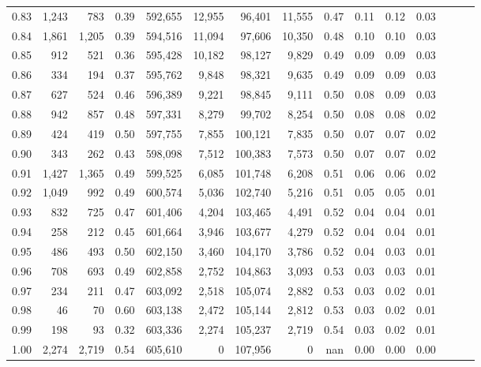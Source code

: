 \begin{tabular}{rrrrrrrrrrrrrrr}
0.83 &   1,243 &    783 &  0.39 &  592,655 &   12,955 &   96,401 &   11,555 &  0.47 &  0.11 &  0.12 &      0.03 \\
0.84 &   1,861 &  1,205 &  0.39 &  594,516 &   11,094 &   97,606 &   10,350 &  0.48 &  0.10 &  0.10 &      0.03 \\
0.85 &     912 &    521 &  0.36 &  595,428 &   10,182 &   98,127 &    9,829 &  0.49 &  0.09 &  0.09 &      0.03 \\
0.86 &     334 &    194 &  0.37 &  595,762 &    9,848 &   98,321 &    9,635 &  0.49 &  0.09 &  0.09 &      0.03 \\
0.87 &     627 &    524 &  0.46 &  596,389 &    9,221 &   98,845 &    9,111 &  0.50 &  0.08 &  0.09 &      0.03 \\
0.88 &     942 &    857 &  0.48 &  597,331 &    8,279 &   99,702 &    8,254 &  0.50 &  0.08 &  0.08 &      0.02 \\
0.89 &     424 &    419 &  0.50 &  597,755 &    7,855 &  100,121 &    7,835 &  0.50 &  0.07 &  0.07 &      0.02 \\
0.90 &     343 &    262 &  0.43 &  598,098 &    7,512 &  100,383 &    7,573 &  0.50 &  0.07 &  0.07 &      0.02 \\
0.91 &   1,427 &  1,365 &  0.49 &  599,525 &    6,085 &  101,748 &    6,208 &  0.51 &  0.06 &  0.06 &      0.02 \\
0.92 &   1,049 &    992 &  0.49 &  600,574 &    5,036 &  102,740 &    5,216 &  0.51 &  0.05 &  0.05 &      0.01 \\
0.93 &     832 &    725 &  0.47 &  601,406 &    4,204 &  103,465 &    4,491 &  0.52 &  0.04 &  0.04 &      0.01 \\
0.94 &     258 &    212 &  0.45 &  601,664 &    3,946 &  103,677 &    4,279 &  0.52 &  0.04 &  0.04 &      0.01 \\
0.95 &     486 &    493 &  0.50 &  602,150 &    3,460 &  104,170 &    3,786 &  0.52 &  0.04 &  0.03 &      0.01 \\
0.96 &     708 &    693 &  0.49 &  602,858 &    2,752 &  104,863 &    3,093 &  0.53 &  0.03 &  0.03 &      0.01 \\
0.97 &     234 &    211 &  0.47 &  603,092 &    2,518 &  105,074 &    2,882 &  0.53 &  0.03 &  0.02 &      0.01 \\
0.98 &      46 &     70 &  0.60 &  603,138 &    2,472 &  105,144 &    2,812 &  0.53 &  0.03 &  0.02 &      0.01 \\
0.99 &     198 &     93 &  0.32 &  603,336 &    2,274 &  105,237 &    2,719 &  0.54 &  0.03 &  0.02 &      0.01 \\
1.00 &   2,274 &  2,719 &  0.54 &  605,610 &        0 &  107,956 &        0 &   nan &  0.00 &  0.00 &      0.00 \\
\bottomrule
\end{tabular}
